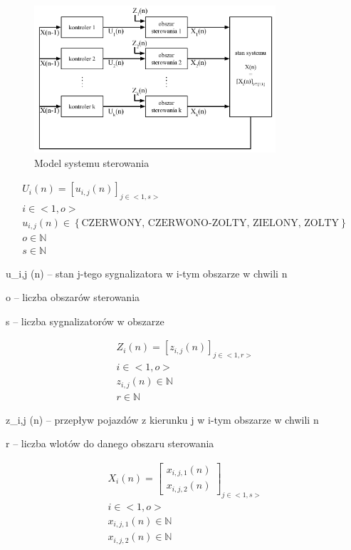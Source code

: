 \begin{figure}[h]
    \centering
    \includegraphics[width=0.8\textwidth]{images/model.pdf}
    \caption{Model systemu sterowania}
    \label{fig:model}
\end{figure}

\begin{equation}
	\begin{array}{c}
		U_i (n) = \left[ u_{i, j} (n) \right]_{j \in <1,s>}\\
		i \in <1,o>\\
		u_{i, j} (n) \in \left\{ \textrm{CZERWONY, CZERWONO-ZOLTY, ZIELONY, ZOLTY} \right\}\\
		o \in \mathbb{N}\\
		s \in \mathbb{N}
	\end{array}
\end{equation}

u_{i,j} (n) \textrm{ -- stan j-tego sygnalizatora w i-tym obszarze w chwili n}

o -- liczba obszarów sterowania

s -- liczba sygnalizatorów w obszarze

\begin{equation}
	\begin{array}{c}
		Z_i (n) = \left[ z_{i, j} (n) \right]_{j \in <1,r>}\\
		i \in <1,o>\\
		z_{i, j} (n) \in \mathbb{N}\\
		r \in \mathbb{N}
	\end{array}
\end{equation}

z_{i,j} (n) \textrm{ -- przepływ pojazdów z kierunku j w i-tym obszarze w chwili n}

r -- liczba wlotów do danego obszaru sterowania

\begin{equation}
	\begin{array}{c}
		X_i (n) = \left[
			\begin{array}{c}
				x_{i, j, 1} (n) \\ x_{i, j, 2} (n)
			\end{array}
		\right]_{j \in <1,s>}\\
		i \in <1,o>\\
		x_{i, j, 1} (n) \in \mathbb{N}\\
		x_{i, j, 2} (n) \in \mathbb{N}
	\end{array}
\end{equation}

